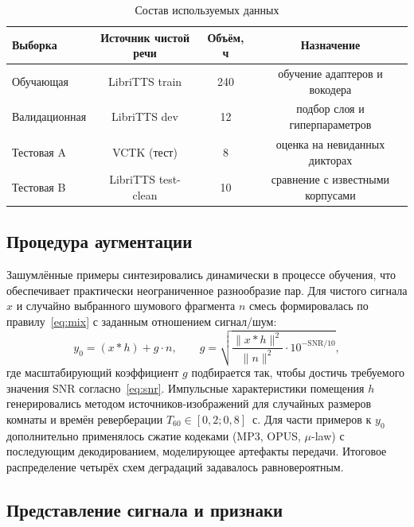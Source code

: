 \begin{table}[H]
    \caption{Состав используемых данных}
    \label{tab:data}
    \centering
    \footnotesize
    \begin{tabularx}{\textwidth}{X c c c}
        \toprule
        Выборка & Источник чистой речи & Объём, ч & Назначение \\
        \midrule
        Обучающая    & LibriTTS train     & 240 & обучение адаптеров и вокодера \\
        Валидационная & LibriTTS dev       & 12  & подбор слоя и гиперпараметров \\
        Тестовая A   & VCTK (тест)         & 8   & оценка на невиданных дикторах \\
        Тестовая B   & LibriTTS test-clean & 10  & сравнение с известными корпусами \\
        \bottomrule
    \end{tabularx}
\end{table}

\subsection{Процедура аугментации}
\label{ssec:augment}

Зашумлённые примеры синтезировались динамически в процессе обучения, что
обеспечивает практически неограниченное разнообразие пар. Для чистого сигнала
$x$ и случайно выбранного шумового фрагмента $n$ смесь формировалась по
правилу~\eqref{eq:mix} с заданным отношением сигнал/шум:
\begin{equation}
    y_0 = (x * h) + g\cdot n,
    \qquad
    g = \sqrt{\frac{\|x*h\|^2}{\|n\|^2}\cdot 10^{-\mathrm{SNR}/10}},
    \label{eq:mix}
\end{equation}
где масштабирующий коэффициент $g$ подбирается так, чтобы достичь требуемого
значения $\mathrm{SNR}$ согласно~\eqref{eq:snr}. Импульсные характеристики
помещения $h$ генерировались методом источников-изображений для случайных
размеров комнаты и времён реверберации $T_{60}\in[0{,}2; 0{,}8]$~с. Для части
примеров к $y_0$ дополнительно применялось сжатие кодеками (MP3, OPUS, $\mu$-law)
с последующим декодированием, моделирующее артефакты передачи. Итоговое
распределение четырёх схем деградаций задавалось равновероятным.

\subsection{Представление сигнала и признаки}
\label{ssec:features}

